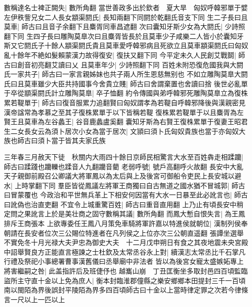 數稱達名士裨正闕失|{
	數所角翻}
當世善政多出於欽者　夏大旱　匈奴呼韓邪單于嬖左伊秩訾兄女二人長女顓渠閼氏|{
	長知兩翻下同閼於乾翻氏音支下同}
生二子長曰且莫車|{
	師古曰且音子余翻下且麋胥同車昌遮翻}
次曰囊知牙斯少女為大閼氏|{
	少詩照翻下同}
生四子長曰雕陶莫臯次曰且麋胥皆長於且莫車少子咸樂二人皆小於囊知牙斯又它閼氏子十餘人顓渠閼氏貴且莫車愛呼韓邪病且死欲立且莫車顓渠閼氏曰匈奴亂十餘年不絶如髮賴蒙漢力故得復安|{
	復扶又翻下同}
今平定未久人民創艾戰鬬|{
	師古曰創音初亮翻艾讀曰乂}
且莫車年少|{
	少詩照翻下同}
百姓未附恐復危國我與大閼氏一家共子|{
	師古曰一家言親姊妹也共子兩人所生恩慈無别也}
不如立雕陶莫臯大閼氏曰且莫車雖少大臣共持國事今舍貴立賤|{
	師古曰舍謂棄置也舍讀曰捨}
後世必亂單于卒從顓渠閼氏計立雕陶莫臯|{
	卒子恤翻}
約令傳國與弟呼韓邪死雕陶莫臯立為復株累若鞮單于|{
	師古曰復音服累力追翻賢曰匈奴謂孝為若鞮自呼韓邪降後與漢親密見漢帝諡常為孝慕之至其子復株累單于以下皆稱若鞮}
復株累若鞮單于以且麋胥為左賢王且莫車為左谷蠡王|{
	谷音鹿蠡盧奚翻}
囊知牙斯為右賢王復株累單于復妻王昭君生二女長女云為須卜居次小女為當于居次|{
	文頴曰須卜氏匈奴貴族也當于亦匈奴大族也師古曰須卜當于皆其夫家氏族}


三年春三月赦天下徒　秋關内大雨四十餘日京師民相驚言大水至百姓犇走相蹂躪|{
	師古曰蹂踐也躪轢也蹂音人九翻躪音藺}
老弱呼號|{
	號戶高翻呼火故翻}
長安中大亂天子親御前殿召公卿議大將軍鳳以為太后與上及後宮可御船令吏民上長安城以避水|{
	上時掌翻下同}
羣臣皆從鳳議左將軍王商獨曰自古無道之國水猶不冒城郭|{
	師古曰冒蒙覆也}
今政治和平世無兵革上下相安何因當有大水一日暴至此必訛言也|{
	師古曰訛偽也治直吏翻}
不宜令上城重驚百姓|{
	師古曰重音直用翻}
上乃止有頃長安中稍定問之果訛言上於是美壮商之固守數稱其議|{
	數所角翻}
而鳳大慙自恨失言|{
	為王鳳排斥王商張本}
上欲專委任王鳳八月策免車騎將軍許嘉以特進侯就朝位|{
	漢制列侯奉朝請在長安者位次三公賜位特進者在凡列侯之上位亦次三公朝直遥翻}
張譚坐選舉不實免冬十月光禄大夫尹忠為御史大夫　十二月戊申朔日有食之其夜地震未央宮殿中詔舉賢良方正能直言極諫之士杜欽及太常丞谷永上對|{
	續漢志太常丞比千石掌凡行禮及祭祀小事總署曹事漢舊儀曰丞舉廟中非法者}
皆以為後宮女寵太盛嫉妬專上將害繼嗣之咎|{
	此盖指許后及班倢伃也}
越巂山崩　丁丑匡衡坐多取封邑四百頃監臨盜所主守直十金以上免為庶人|{
	衡本封臨淮郡僮縣之樂安鄉鄉本田提封三千一百頃南以閩陌為界後誤封平陵陌為界多四百頃師古曰十金以上當時律定罪之次若今律條言一尺以上一匹以上}


